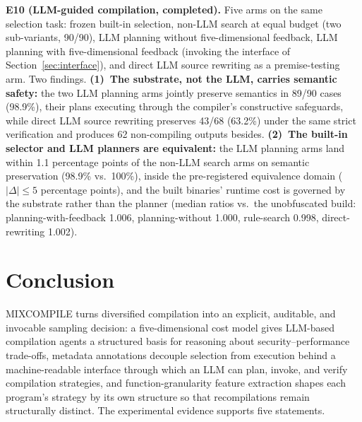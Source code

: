 \documentclass[pdflatex,sn-mathphys-num]{sn-jnl}
\theoremstyle{thmstyleone}%
\theoremstyle{thmstyletwo}%
\theoremstyle{thmstylethree}%
\begin{document}
\textbf{E10 (LLM-guided compilation, completed).} Five arms on the same selection
task: frozen built-in selection, non-LLM search at equal budget (two sub-variants,
90/90), LLM planning without five-dimensional feedback, LLM planning with
five-dimensional feedback (invoking the interface of Section~\ref{sec:interface}),
and direct LLM source rewriting as a premise-testing arm. Two findings.
\textbf{(1)~The substrate, not the LLM, carries semantic safety:} the two LLM
planning arms jointly preserve semantics in 89/90 cases (98.9\%), their plans
executing through the compiler's constructive safeguards, while direct LLM source
rewriting preserves 43/68 (63.2\%) under the same strict verification and produces 62
non-compiling outputs besides.
\textbf{(2)~The built-in selector and LLM planners are equivalent:} the LLM planning
arms land within 1.1 percentage points of the non-LLM search arms on semantic
preservation (98.9\% vs.\ 100\%), inside the pre-registered equivalence domain
($|\Delta|\leq5$ percentage points), and the built binaries' runtime cost is governed
by the substrate rather than the planner (median ratios vs.\ the unobfuscated build:
planning-with-feedback 1.006, planning-without 1.000, rule-search 0.998,
direct-rewriting 1.002).

\section{Conclusion}

MIXCOMPILE turns diversified compilation into an explicit, auditable, and invocable
sampling decision: a five-dimensional cost model gives LLM-based compilation agents
a structured basis for reasoning about security--performance trade-offs, metadata
annotations decouple selection from execution behind a machine-readable interface
through which an LLM can plan, invoke, and verify compilation strategies, and
function-granularity feature extraction shapes each program's strategy by its own
structure so that recompilations remain structurally distinct. The experimental
evidence supports five statements.
\end{document}
